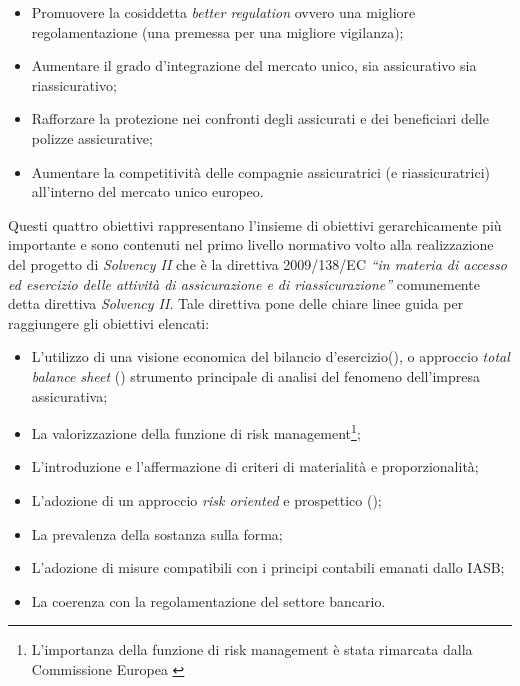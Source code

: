 \begin{itemize}
\item Promuovere la cosiddetta {\itshape better regulation} ovvero una migliore regolamentazione (una premessa per una migliore vigilanza);
\item Aumentare il grado d’integrazione del mercato unico, sia assicurativo sia riassicurativo;
\item Rafforzare la protezione nei confronti degli assicurati e dei beneficiari delle polizze assicurative;
\item Aumentare la competitività delle compagnie assicuratrici (e riassicuratrici) all’interno del mercato unico europeo.
\end{itemize}

Questi quattro obiettivi rappresentano l’insieme di obiettivi gerarchicamente più importante e sono contenuti nel primo livello normativo volto alla realizzazione del progetto di \textit{\textit{Solvency I}I} che è la direttiva 2009/138/EC {\itshape “in materia di accesso ed esercizio delle attività di assicurazione e di riassicurazione”} comunemente detta direttiva \textit{\textit{Solvency I}I}. Tale direttiva pone delle chiare linee guida per raggiungere gli obiettivi elencati:

\begin{itemize}
\item	 L'utilizzo di una visione economica del bilancio d’esercizio(\cite[pp. 5-6]{hajek}), o approccio {\itshape total balance sheet} (\cite[pp. 4 et 40]{reportqis5}) strumento principale di analisi del fenomeno dell’impresa assicurativa;
\item La valorizzazione della funzione di risk management\footnote{L’importanza della funzione di risk management è stata rimarcata dalla Commissione Europea \cite{amendedfw}};
\item L'introduzione e l’affermazione di criteri di materialità e proporzionalità;
\item L'adozione di un approccio {\itshape risk oriented} e prospettico (\cite[p. 210]{ania2006});
\item La prevalenza della sostanza sulla forma;
\item L'adozione di misure compatibili con i principi contabili emanati dallo IASB;
\item La coerenza con la regolamentazione del settore bancario.
\end{itemize}

